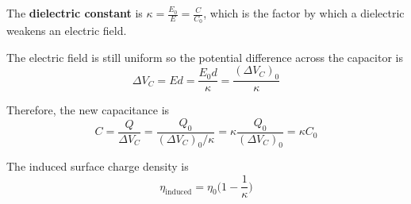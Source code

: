 \documentclass{article}
\begin{document}
The \textbf{dielectric constant} is $\kappa = \frac{E_0}{E} = \frac{C}{C_0}$, which is the factor
by which a dielectric weakens an electric field.
\newline

The electric field is still uniform so the potential difference across the capacitor is
\[\Delta V_C=Ed=\frac{E_0 d}{\kappa}=\frac{(\Delta V_C)_0}{\kappa}\]

Therefore, the new capacitance is
\[C=\frac{Q}{\Delta V_C}=\frac{Q_0}{(\Delta V_C)_0 / \kappa}=\kappa \frac{Q_0}{(\Delta V_C)_0}=
\kappa C_0\]

The induced surface charge density is
\[\eta_\text{induced}=\eta_0 \Big(1-\frac{1}{\kappa}\Big)\]
\end{document}
